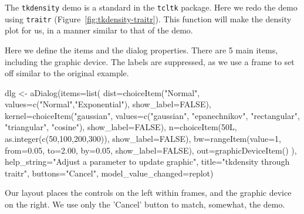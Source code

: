 \documentclass{article}
\newcommand{\code}[1]{\texttt{#1}} %
\newcommand{\pkg}[1]{\texttt{#1}}
\begin{document}
The \code{tkdensity} demo is a standard in the \pkg{tcltk}
package. Here we redo the demo using \pkg{traitr}
(Figure~\ref{fig:tkdensity-traitr}). This function will make the
density plot for us, in a manner similar to that of the demo.
\begin{Schunk}
\end{Schunk}
Here we define the items and the dialog properties. There are 5 main
items, including the graphic device. The labels are suppressed, as we
use a frame to set off similar to the original example. 
\begin{Schunk}
\begin{Sinput}
 dlg <- aDialog(items=list(
                  dist=choiceItem("Normal", values=c("Normal","Exponential"),
                    show_label=FALSE),
                  kernel=choiceItem("gaussian",
                    values=c("gaussian", "epanechnikov", "rectangular",
                      "triangular", "cosine"),
                    show_label=FALSE),
                  n=choiceItem(50L, as.integer(c(50,100,200,300)),
                    show_label=FALSE),
                  bw=rangeItem(value=1, from=0.05, to=2.00, by=0.05,
                    show_label=FALSE),
                  out=graphicDeviceItem()
                  ),
                help_string="Adjust a parameter to update graphic",
                title="tkdensity through traitr",
                buttons="Cancel",
                model_value_changed=replot)
\end{Sinput}
\end{Schunk}
Our layout places the controls on the left within frames, and the
graphic device on the right. We use only the 'Cancel' button to match,
somewhat, the demo.
\begin{Schunk}
\end{Schunk}
\end{document}
